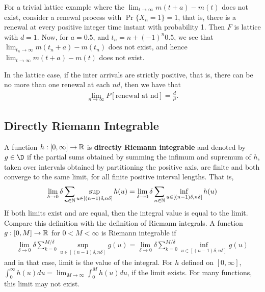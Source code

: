 \documentclass[a4paper,10pt,english]{article}
\begin{document}
\begin{shaded*}
For a trivial lattice example where the $\lim_{t\to \infty} m(t+a)-m(t)$ does not exist, consider a renewal process with $\Pr\{X_n = 1\} = 1$, that is, there is a renewal at every positive integer time instant with probability 1. Then $F$ is lattice with $d=1.$ Now, for $a=0.5$, and $t_n = n+(-1)^n 0.5$, we see that $\lim_{t_n \to \infty} m(t_n+a)-m(t_n)$ does not exist, and hence $\lim_{t \to \infty} m(t+a)-m(t)$ does not exist.
\end{shaded*}

In the lattice case, if the inter arrivals are strictly positive, that is, there can be no more than one renewal at each $nd$, then we have that 
\begin{align}
\lim_{n\to \infty} P[{\text{renewal at nd}}] = \frac{d}{\mu}.
\end{align}

\subsection{Directly Riemann Integrable}
A function $h: [0,\infty] \rightarrow \mathbb{R}$ is \textbf{directly Riemann integrable} and denoted by $g \in \D$ if the partial sums obtained by summing the infimum and supremum of $h$, taken over intervals obtained by partitioning the positive axis, are finite and both converge to the same limit, for all finite positive interval lengths. That is,
\begin{equation*}
	\lim_{\delta \rightarrow 0} \delta \sum_{n \in \mathbb{N}}\sup_{ u \in [(n-1)\delta,n\delta]}h(u)=\lim_{\delta \rightarrow 0} \delta \sum_{n \in \mathbb{N}}\inf_{ u \in [(n-1)\delta,n\delta]}h(u)  
\end{equation*}   
 If both limits exist and are equal, then the integral value is equal to the limit. 
Compare this definition with the definition of Riemann integrals. 
A function $g: [0, M] \rightarrow \mathbb{R} $ for $0<M<\infty$ is Riemann integrable if 
   \begin{eqnarray*}
  \lim_{\delta \rightarrow 0} \delta \sum_{k=0}^{M/\delta}\sup_{ u \in [(n-1)\delta,n\delta]}g(u)=\lim_{\delta \rightarrow 0} \delta \sum_{k=0}^{M/\delta}\inf_{ u \in [(n-1)\delta,n\delta]}g(u)  
  \end{eqnarray*} 
   and in that case, limit is the value of the integral. For $h$ defined on $[0,\infty]$, $\int_{0}^{\infty}h(u)du = \lim_{M \rightarrow \infty}\int_{0}^{M}h(u)du$, if the limit exists. For many functions, this limit may not exist.
\end{document}
